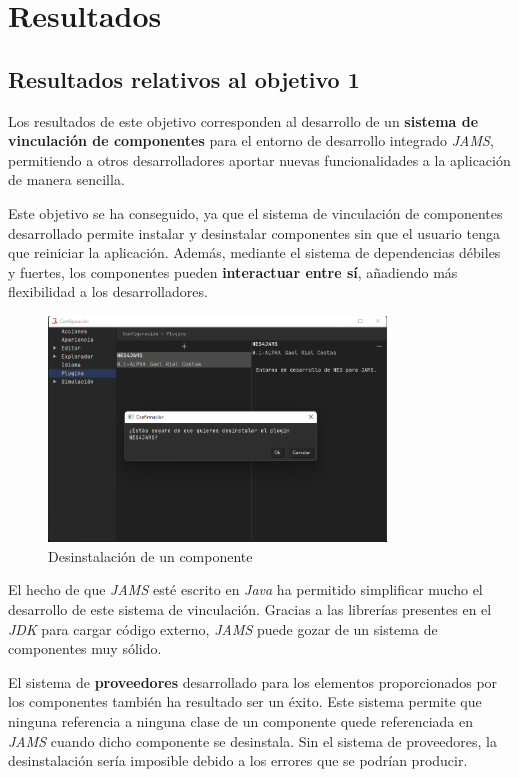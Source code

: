 \chapter{Resultados}\label{ch:resultados}


\section{Resultados relativos al objetivo 1}\label{sec:resultados-relativos-al-objetivo-1}

Los resultados de este objetivo corresponden al desarrollo
de un \textbf{sistema de vinculación de componentes} para el
entorno de desarrollo integrado \textit{JAMS},
permitiendo a otros desarrolladores aportar nuevas funcionalidades
a la aplicación de manera sencilla.

Este objetivo se ha conseguido, ya que el sistema de
vinculación de componentes desarrollado permite
instalar y desinstalar componentes sin que el usuario tenga
que reiniciar la aplicación.
Además, mediante el sistema de dependencias débiles y fuertes,
los componentes pueden \textbf{interactuar entre sí}, añadiendo
más flexibilidad a los desarrolladores.

\begin{figure}[h]
    \centering
    \includegraphics[width=0.8\textwidth]{images/results/jams-uninstall}
    \caption{Desinstalación de un componente}
    \label{fig:jams-uninstall}
\end{figure}

El hecho de que \textit{JAMS} esté escrito en \textit{Java}
ha permitido simplificar mucho el desarrollo de este sistema
de vinculación.
Gracias a las librerías presentes en el \textit{JDK} para cargar
código externo, \textit{JAMS} puede gozar de un sistema de componentes
muy sólido.

El sistema de \textbf{proveedores} desarrollado para los elementos
proporcionados por los componentes también ha resultado ser un éxito.
Este sistema permite que ninguna referencia a ninguna clase de un
componente quede referenciada en \textit{JAMS} cuando dicho componente
se desinstala.
Sin el sistema de proveedores, la desinstalación sería imposible debido
a los errores que se podrían producir.


